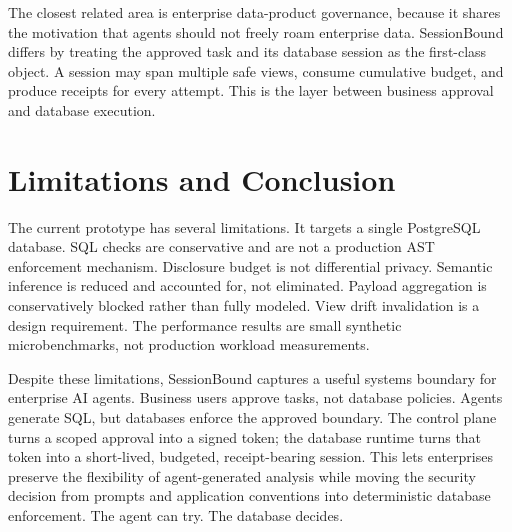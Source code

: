 \documentclass[10pt,twocolumn]{article}
\begin{document}
The closest related area is enterprise data-product governance, because
it shares the motivation that agents should not freely roam enterprise
data. SessionBound differs by treating the approved task and its
database session as the first-class object. A session may span multiple
safe views, consume cumulative budget, and produce receipts for every
attempt. This is the layer between business approval and database
execution.

\section{Limitations and Conclusion}

The current prototype has several limitations. It targets a single
PostgreSQL database. SQL checks are conservative and are not a
production AST enforcement mechanism. Disclosure budget is not
differential privacy. Semantic inference is reduced and accounted for,
not eliminated. Payload aggregation is conservatively blocked rather
than fully modeled. View drift invalidation is a design requirement. The
performance results are small synthetic microbenchmarks, not production
workload measurements.

Despite these limitations, SessionBound captures a useful systems
boundary for enterprise AI agents. Business users approve tasks, not
database policies. Agents generate SQL, but databases enforce the
approved boundary. The control plane turns a scoped approval into a
signed token; the database runtime turns that token into a short-lived,
budgeted, receipt-bearing session. This lets enterprises preserve the
flexibility of agent-generated analysis while moving the security
decision from prompts and application conventions into deterministic
database enforcement. The agent can try. The database decides.



\end{document}
